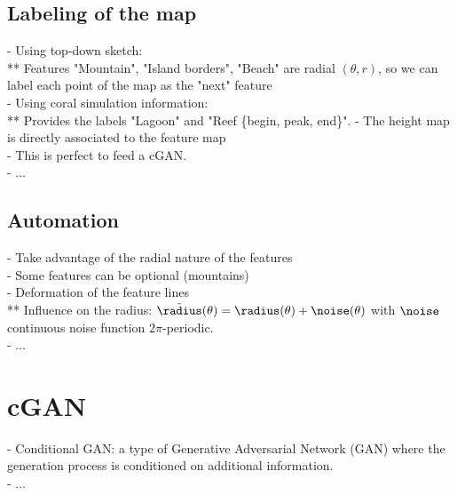 \subsection{Labeling of the map}
- Using top-down sketch: \\
** Features "Mountain", "Island borders", "Beach" are radial $(\theta, r)$, so we can label each point of the map as the "next" feature \\
- Using coral simulation information: \\
** Provides the labels "Lagoon" and "Reef \{begin, peak, end\}".
- The height map is directly associated to the feature map \\
- This is perfect to feed a cGAN. \\
- ... 

\subsection{Automation}
- Take advantage of the radial nature of the features \\
- Some features can be optional (mountains) \\
- Deformation of the feature lines \\ 
** Influence on the radius: $\Tilde \radius(\theta) = \radius(\theta) + \noise(\theta)$ with $\noise$ continuous noise function $2\pi$-periodic. \\
- ...

\section{cGAN}
\label{sec:coral-island_cGAN}
- Conditional GAN: a type of Generative Adversarial Network (GAN) where the generation process is conditioned on additional information. \\
- ...

